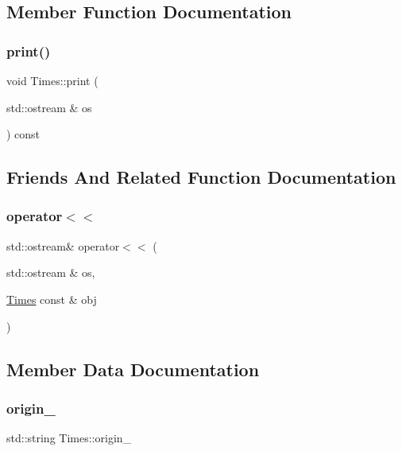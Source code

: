 \subsection{Member Function Documentation}
\mbox{\label{class_times_acdfa95279c544d2cee2f33415fe4909c}} 
\subsubsection{\texorpdfstring{print()}{print()}}
{\footnotesize\ttfamily void Times\+::print (\begin{DoxyParamCaption}\item[{std\+::ostream \&}]{os }\end{DoxyParamCaption}) const}



\subsection{Friends And Related Function Documentation}
\mbox{\label{class_times_a0c37c7d9833e9b02d1a219555f55fe34}} 
\subsubsection{\texorpdfstring{operator$<$$<$}{operator<<}}
{\footnotesize\ttfamily std\+::ostream\& operator$<$$<$ (\begin{DoxyParamCaption}\item[{std\+::ostream \&}]{os,  }\item[{\mbox{\hyperlink{class_times}{Times}} const \&}]{obj }\end{DoxyParamCaption})\hspace{0.3cm}{\ttfamily [friend]}}



\subsection{Member Data Documentation}
\mbox{\label{class_times_a7609195d9216105cad01df13230abfa9}} 
\subsubsection{\texorpdfstring{origin\+\_\+}{origin\_}}
{\footnotesize\ttfamily std\+::string Times\+::origin\+\_\+\hspace{0.3cm}{\ttfamily [protected]}}

